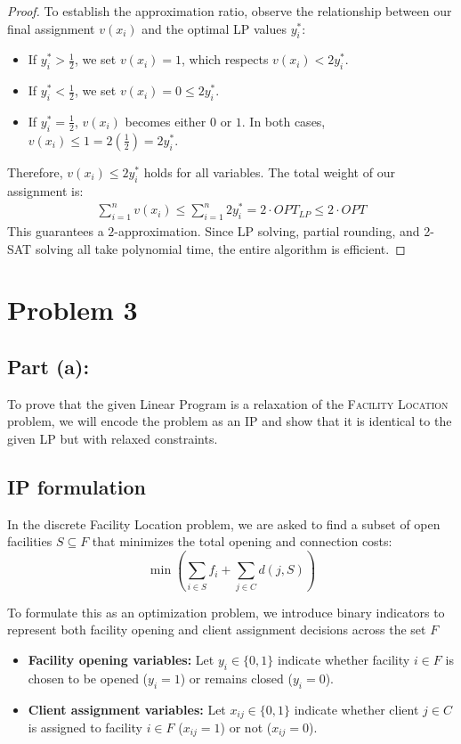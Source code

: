 \begin{enumerate}[label=(\alph*), leftmargin=*, align=left]
\begin{proof}
        To establish the approximation ratio, observe the relationship between our final assignment $v(x_i)$ and the optimal LP values $y^*_i$:
        \begin{itemize}
            \item If $y^*_i > \frac{1}{2}$, we set $v(x_i) = 1$, which respects $v(x_i) < 2y^*_i$.
            \item If $y^*_i < \frac{1}{2}$, we set $v(x_i) = 0 \le 2y^*_i$.
            \item If $y^*_i = \frac{1}{2}$, $v(x_i)$ becomes either $0$ or $1$. In both cases, $v(x_i) \le 1 = 2(\frac{1}{2}) = 2y^*_i$.
        \end{itemize}
        Therefore, $v(x_i) \le 2y^*_i$ holds for all variables. The total weight of our assignment is:
        \begin{align*}
            \sum_{i=1}^{n} v(x_i) \le \sum_{i=1}^{n} 2y^*_i = 2 \cdot OPT_{LP} \le 2 \cdot OPT
        \end{align*}
        This guarantees a $2$-approximation. Since LP solving, partial rounding, and 2-SAT solving all take polynomial time, the entire algorithm is efficient.
    \end{proof}
\end{enumerate}


\newpage
\section*{Problem 3}
\subsection*{Part (a):}

To prove that the given Linear Program is a relaxation of the \textsc{Facility Location} problem, we will encode the problem as an IP and show that it is identical to the given LP but with relaxed constraints.

\subsection*{IP formulation}

In the discrete Facility Location problem, we are asked to find a subset of open facilities $S \subseteq F$ that minimizes the total opening and connection costs:
\[ \min \left( \sum_{i \in S} f_i + \sum_{j \in C} d(j, S) \right) \]

To formulate this as an optimization problem, we introduce binary indicators to represent both facility opening and client assignment decisions across the set $F$
\begin{itemize}
    \item \textbf{Facility opening variables:} Let $y_i \in \{0, 1\}$ indicate whether facility $i \in F$ is chosen to be opened ($y_i = 1$) or remains closed ($y_i = 0$).
    \item \textbf{Client assignment variables:} Let $x_{ij} \in \{0, 1\}$ indicate whether client $j \in C$ is assigned to facility $i \in F$ ($x_{ij} = 1$) or not ($x_{ij} = 0$).
\end{itemize}

